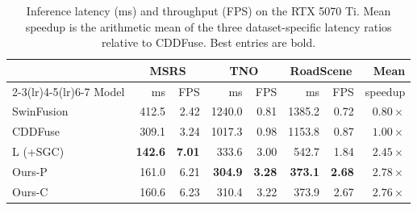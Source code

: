 \begin{table}[!t]
\centering
\caption{Inference latency (ms) and throughput (FPS) on the RTX 5070 Ti. Mean speedup is the arithmetic mean of the three dataset-specific latency ratios relative to CDDFuse. Best entries are bold.}
\label{tab:efficiency_comparison}
\small
\setlength{\tabcolsep}{9pt}
\begin{tabular}{@{}lrrrrrrr@{}}
\toprule
 & \multicolumn{2}{c}{MSRS} & \multicolumn{2}{c}{TNO} & \multicolumn{2}{c}{RoadScene} & Mean\\
\cmidrule(lr){2-3}\cmidrule(lr){4-5}\cmidrule(lr){6-7}
Model & ms & FPS & ms & FPS & ms & FPS & speedup\\
\midrule
SwinFusion & 412.5 & 2.42 & 1240.0 & 0.81 & 1385.2 & 0.72 & $0.80\times$\\
CDDFuse & 309.1 & 3.24 & 1017.3 & 0.98 & 1153.8 & 0.87 & $1.00\times$\\
L (+SGC) & \textbf{142.6} & \textbf{7.01} & 333.6 & 3.00 & 542.7 & 1.84 & $2.45\times$\\
Ours-P & 161.0 & 6.21 & \textbf{304.9} & \textbf{3.28} & \textbf{373.1} & \textbf{2.68} & $\mathbf{2.78\times}$\\
Ours-C & 160.6 & 6.23 & 310.4 & 3.22 & 373.9 & 2.67 & $2.76\times$\\
\bottomrule
\end{tabular}
\end{table}
